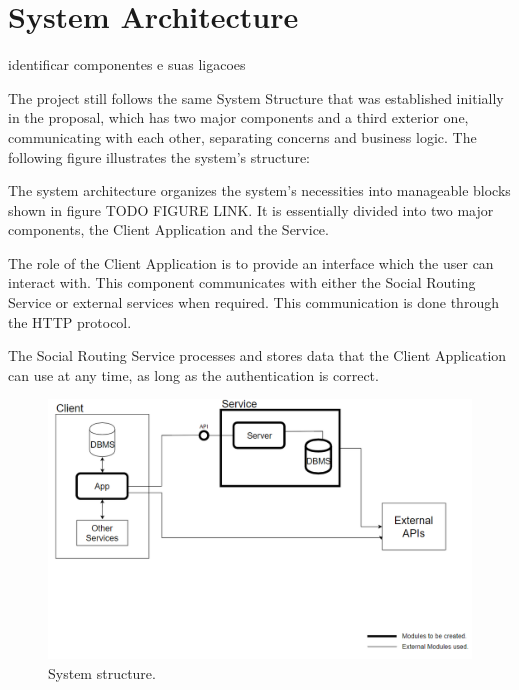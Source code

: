 \section{System Architecture}
        identificar componentes e suas ligacoes

        The project still follows the same System Structure that was established initially in the proposal, which has two major components and a 
        third exterior one, communicating with each other, separating concerns and business logic. The following figure illustrates the system's structure:
        
        The system architecture organizes the system's necessities into manageable blocks shown in figure TODO FIGURE LINK.
        It is essentially divided into two major components, the Client Application and the Service.
        
        The role of the Client Application is to provide an interface which the user can interact with. This component communicates 
        with either the Social Routing Service or external services when required. This communication is done through the HTTP protocol.
        
        The Social Routing Service processes and stores data that the Client Application can use at any time, as long as the authentication
        is correct.  

        \begin{figure}[h]            
            \includegraphics[width=\textwidth]{images/project-structure/system-structure.PNG}
            \caption{System structure.}
            \label{fig:systemstructure}
        \end{figure}  